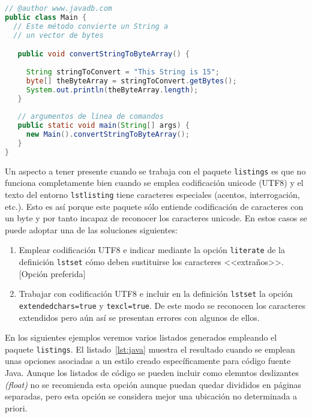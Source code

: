 \documentclass[11pt,a4paper]{article}
\begin{document}
\begin{lstlisting}[language=Java,caption={[Código fuente en Java]Ejemplo de código fuente en lenguaje Java},label=lst:java]
// @author www.javadb.com
public class Main {    
  // Este método convierte un String a
  // un vector de bytes

   public void convertStringToByteArray() {
        
     String stringToConvert = "This String is 15";      
     byte[] theByteArray = stringToConvert.getBytes();        
     System.out.println(theByteArray.length);        
   }
    
   // argumentos de línea de comandos 
   public static void main(String[] args) {
     new Main().convertStringToByteArray();
   }
}
\end{lstlisting}

Un aspecto a tener presente cuando se trabaja con el paquete \texttt{listings} es que no funciona completamente bien cuando se emplea codificación unicode (UTF8) y el texto del entorno \texttt{lstlisting} tiene caracteres especiales (acentos, interrogación, etc.). Esto es así porque este paquete sólo entiende codificación de caracteres con un byte y por tanto incapaz de reconocer los caracteres unicode. En estos casos se puede adoptar una de las soluciones siguientes: 

\begin{enumerate}
	\item Emplear codificación UTF8 e indicar mediante la opción \texttt{literate} de la definición \texttt{lstset} cómo deben sustituirse los caracteres <<extraños>>. [Opción preferida]
	\item Trabajar con codificación UTF8 e incluir en la definición \texttt{lstset} la opción \texttt{extendedchars=true} y \texttt{texcl=true}. De este modo se reconocen los caracteres extendidos pero aún así se presentan errores con algunos de ellos.
\end{enumerate}

En los siguientes ejemplos veremos varios listados generados empleando el paquete \texttt{listings}. El listado~\ref{lst:java} muestra el resultado cuando se emplean unas opciones asociadas a un estilo creado específicamente para código fuente Java. Aunque los listados de código se pueden incluir como elemntos deslizantes \emph{(float)} no se recomienda esta opción aunque puedan quedar divididos en páginas separadas, pero esta opción se considera mejor una ubicación no determinada a priori.
\end{document}

